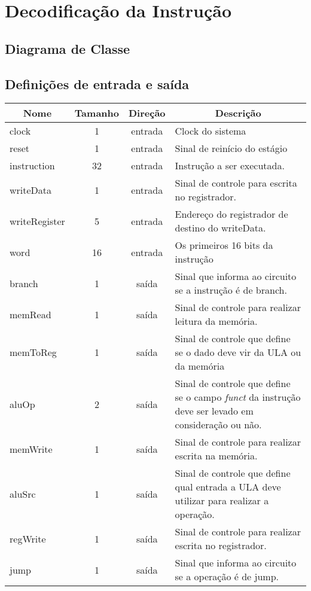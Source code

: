 \section{Decodificação da Instrução}
	\subsection{Diagrama de Classe}
  \begin{figure}[H]
    
  \end{figure}
		
		\subsection{Definições de entrada e saída}
		
	\begin{center}
		\begin{longtable}[pos]{| l | c | c | m{7cm} |} \hline
			\multicolumn{1}{|c|}{\cellcolor[gray]{0.9}\textbf{Nome}} & 
			\multicolumn{1}{c|}{\cellcolor[gray]{0.9}\textbf{Tamanho}} & 
			\multicolumn{1}{c|}{\cellcolor[gray]{0.9}\textbf{Direção}} &
			\multicolumn{1}{c|}{\cellcolor[gray]{0.9}\textbf{Descrição}} \\ \hline
			\endhead
			\hline
			\endlastfoot
			
			clock & 1 & entrada & Clock do sistema \\ \hline
			reset & 1 & entrada & Sinal de reinício do estágio\\ \hline
			instruction & 32 & entrada & Instrução a ser executada. \\ \hline
			writeData & 1 & entrada & Sinal de controle para escrita no registrador. \\ \hline
			writeRegister & 5 & entrada & Endereço do registrador de destino do writeData. \\ \hline
			word & 16 & entrada & Os primeiros 16 bits da instrução \\ \hline
			branch & 1 & saída & Sinal que informa ao circuito se a instrução é de branch. \\ \hline
			memRead & 1 & saída & Sinal de controle para realizar leitura da memória. \\ \hline
			memToReg & 1 & saída & Sinal de controle que define se o dado deve vir da ULA ou da memória \\ \hline
			aluOp & 2 & saída & Sinal de controle que define se o campo \textit{funct} da instrução deve ser levado em consideração ou não. \\ \hline
			memWrite & 1 & saída & Sinal de controle para realizar escrita na memória. \\ \hline
			aluSrc & 1 & saída & Sinal de controle que define qual entrada a ULA deve utilizar para realizar a operação. \\ \hline
			regWrite & 1 & saída & Sinal de controle para realizar escrita no registrador. \\ \hline
			jump & 1 & saída & Sinal que informa ao circuito se a operação é de jump. \\ \hline
		\end{longtable}
	\end{center}
    
